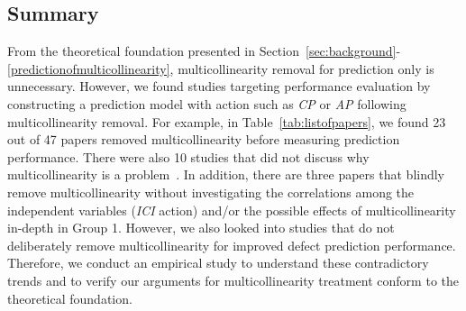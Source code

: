\subsection{Summary} 
From the theoretical foundation presented in Section~\ref{sec:background}-\ref{predictionofmulticollinearity},
multicollinearity removal for prediction only is unnecessary. However, we found studies targeting performance evaluation by constructing a prediction model with action such as \textit{CP} or \textit{AP} following multicollinearity removal.
For example, in Table~\ref{tab:listofpapers}, we found 23 out of 47 papers removed multicollinearity before measuring prediction performance. There were also 10 studies that did not discuss why multicollinearity is a problem~\cite{Posnett2011ASEEcologicalInference, Rahman2013FSEbias, Kamei2016EMSEjit, Rajbahadur2017MSRRegression, Mensah2018ISTDuplex, Ray2014FSElaguageandquality, McIntosh2014MSRCodeReview, Chen2012MSRExplaining, Lee2016TSEMIM, Shang2015EMSElog}. In addition, there are three papers that blindly remove multicollinearity without investigating the correlations among the independent variables (\textit{ICI} action) and/or the possible effects of multicollinearity in-depth in Group 1.
However, we also looked into studies that do not deliberately remove multicollinearity for improved defect prediction performance. Therefore, we conduct an empirical study to understand these contradictory trends and to verify our arguments for multicollinearity treatment conform to the theoretical foundation.



